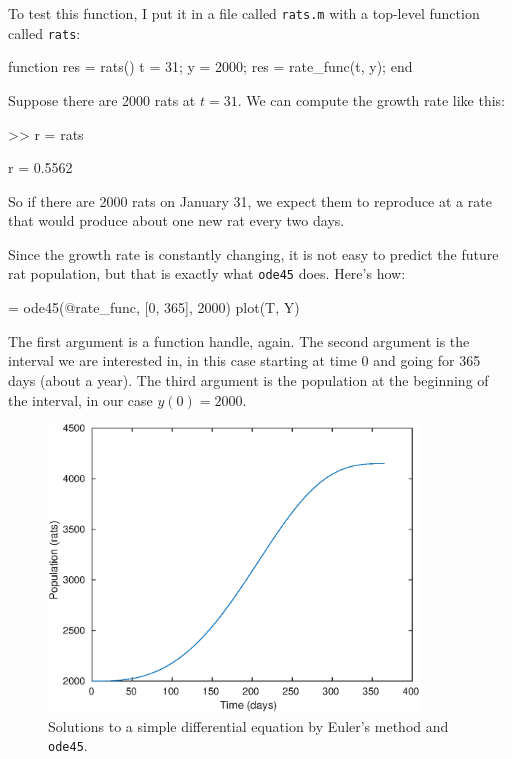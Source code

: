 \documentclass[
]{book}
\numberwithin{Answer}{chapter}
\numberwithin{Exercise}{chapter}
\begin{document}
To test this function, I put it in a file called {\tt rats.m} with a top-level function called {\tt rats}:

\begin{code}
function res = rats()
    t = 31;
    y = 2000;
    res = rate_func(t, y);
end
\end{code}

Suppose there are 2000 rats at $t=31$.  We can compute the growth rate like this:

\begin{code}
>> r = rats

r = 0.5562
\end{code}

So if there are 2000 rats on January 31, we expect them to 
reproduce at a rate that would produce about one new rat every two days. 

Since the growth rate is constantly changing, it is not easy to predict
the future rat population, but that is exactly what {\tt ode45} does.
Here's how:

\begin{code}
[T, Y] = ode45(@rate_func, [0, 365], 2000)
plot(T, Y)
\end{code}

The first argument is a function handle, again.  The second argument is the interval we are interested
in, in this case starting at time 0 and going for 365 days (about a year).  
The third argument is the population at the beginning of the interval, 
in our case $y(0) = 2000$.


\begin{figure}
\centerline{\includegraphics[height=3in]{book/figs/rats.eps}}
\caption{Solutions to a simple differential equation by Euler's method and {\tt ode45}.}
\label{fig:rats}
\end{figure}
\end{document}
